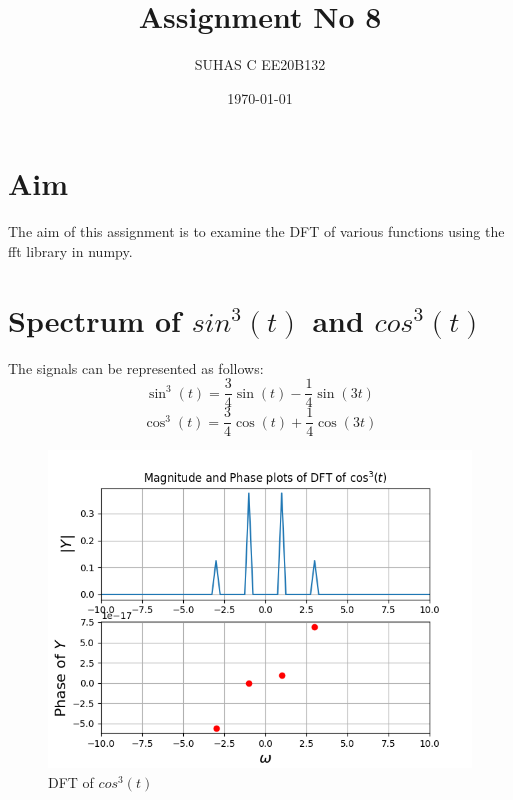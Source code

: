 \documentclass[11pt, a4paper]{article}
\title{Assignment No 8} %
\author{SUHAS C EE20B132} %
\date{\today} %
\begin{document}
		
		
\maketitle %
\section{Aim}
The aim of this assignment is to examine the DFT of various functions using the fft library in numpy.
 
\section{Spectrum of $sin^3(t)$ and $cos^3(t)$}
The signals can be represented as follows:
\begin{equation}
\sin^3(t) = \frac{3}{4}\sin(t) - \frac{1}{4}\sin(3t)
\end{equation}
\begin{equation}
\cos^3(t) = \frac{3}{4}\cos(t) + \frac{1}{4}\cos(3t)
\end{equation}
\begin{figure}[!tbh]
   	\centering
   	\includegraphics[scale=0.5]{figure1.png}  %
   	\caption{DFT of $cos^3(t)$}
   	\label{fig:sample}
   \end{figure} 
\end{document}
